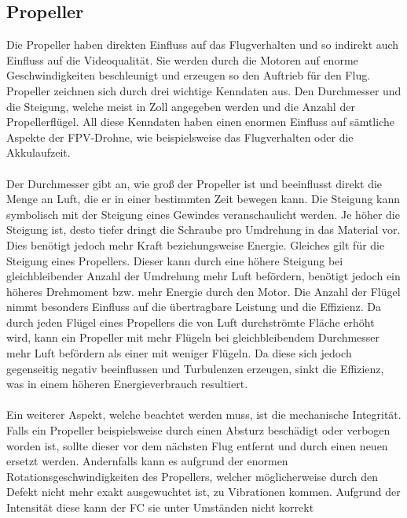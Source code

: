     \subsection[Propeller]{Propeller}
        Die Propeller haben direkten Einfluss auf das Flugverhalten und so indirekt auch Einfluss auf
        die Videoqualität. Sie werden durch die Motoren auf enorme Geschwindigkeiten beschleunigt und
        erzeugen so den Auftrieb für den Flug. Propeller zeichnen sich durch drei wichtige Kenndaten
        aus. Den Durchmesser und die Steigung, welche meist in Zoll angegeben werden und die Anzahl
        der Propellerflügel. All diese Kenndaten haben einen enormen Einfluss auf sämtliche Aspekte der
        FPV-Drohne, wie beispielsweise das Flugverhalten oder die Akkulaufzeit. \\
        \\
        Der Durchmesser gibt an, wie groß der Propeller ist und beeinflusst direkt die Menge an Luft,
        die er in einer bestimmten Zeit bewegen kann. Die Steigung kann symbolisch mit der Steigung
        eines Gewindes veranschaulicht werden. Je höher die Steigung ist, desto tiefer dringt die Schraube
        pro Umdrehung in das Material vor.
    \newpage
        Dies benötigt jedoch mehr Kraft beziehungsweise Energie. Gleiches
        gilt für die Steigung eines Propellers. Dieser kann durch eine höhere Steigung bei gleichbleibender
        Anzahl der Umdrehung mehr Luft befördern, benötigt jedoch ein höheres Drehmoment bzw. mehr Energie
        durch den Motor. Die Anzahl der Flügel nimmt besonders Einfluss auf die übertragbare Leistung und
        die Effizienz. Da durch jeden Flügel eines Propellers die von Luft durchströmte Fläche erhöht wird,
        kann ein Propeller mit mehr Flügeln bei gleichbleibendem Durchmesser mehr Luft befördern als einer
        mit weniger Flügeln. Da diese sich jedoch gegenseitig negativ beeinflussen und Turbulenzen erzeugen,
        sinkt die Effizienz, was in einem höheren Energieverbrauch resultiert.  \\
        \\
        Ein weiterer Aspekt, welche beachtet werden muss, ist die mechanische Integrität. Falls ein Propeller
        beispielsweise durch einen Absturz beschädigt oder verbogen worden ist, sollte dieser vor dem nächsten
        Flug entfernt und durch einen neuen ersetzt werden. Andernfalls kann es aufgrund der enormen
        Rotationsgeschwindigkeiten des Propellers, welcher möglicherweise durch den Defekt nicht mehr exakt ausgewuchtet
        ist, zu Vibrationen kommen. Aufgrund der Intensität diese kann der FC sie unter Umständen nicht korrekt
